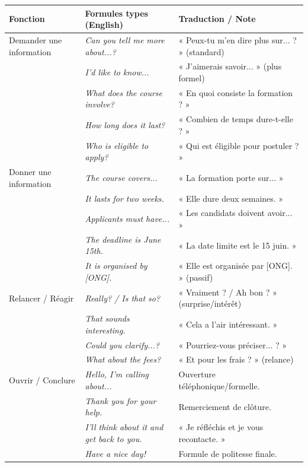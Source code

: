 \documentclass[11pt]{article}
\newcommand{\cle}[1]{{\popxbold\color{popdark}#1}}
\newcommand{\eng}[1]{\ifmmode\text{\textit{#1}}\else\begingroup\selectlanguage{english}\itshape #1\endgroup\fi}
\begin{document}
\begin{center}
\begin{tabularx}{\linewidth}{|p{3.5cm}|X|X|}
\hline
\rowcolor{popblueL} \textbf{Fonction} & \textbf{Formules types (English)} & \textbf{Traduction / Note} \\
\hline
\cle{Demander une information} & \eng{Can you tell me more about...?} & « Peux-tu m'en dire plus sur... ? » (standard) \\
& \eng{I'd like to know...} & « J'aimerais savoir... » (plus formel) \\
& \eng{What does the course involve?} & « En quoi consiste la formation ? » \\
& \eng{How long does it last?} & « Combien de temps dure-t-elle ? » \\
& \eng{Who is eligible to apply?} & « Qui est éligible pour postuler ? » \\
\hline
\cle{Donner une information} & \eng{The course covers...} & « La formation porte sur... » \\
& \eng{It lasts for two weeks.} & « Elle dure deux semaines. » \\
& \eng{Applicants must have...} & « Les candidats doivent avoir... » \\
& \eng{The deadline is June 15th.} & « La date limite est le 15 juin. » \\
& \eng{It is organised by [ONG].} & « Elle est organisée par [ONG]. » (passif) \\
\hline
\cle{Relancer / Réagir} & \eng{Really? / Is that so?} & « Vraiment ? / Ah bon ? » (surprise/intérêt) \\
& \eng{That sounds interesting.} & « Cela a l'air intéressant. » \\
& \eng{Could you clarify...?} & « Pourriez-vous préciser... ? » \\
& \eng{What about the fees?} & « Et pour les frais ? » (relance) \\
\hline
\cle{Ouvrir / Conclure} & \eng{Hello, I'm calling about...} & Ouverture téléphonique/formelle. \\
& \eng{Thank you for your help.} & Remerciement de clôture. \\
& \eng{I'll think about it and get back to you.} & « Je réfléchis et je vous recontacte. » \\
& \eng{Have a nice day!} & Formule de politesse finale. \\
\hline
\end{tabularx}
\end{center}
\end{document}
